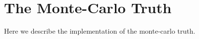 \section{The Monte-Carlo Truth}
\label{MC}
Here we describe the implementation of the monte-carlo truth.